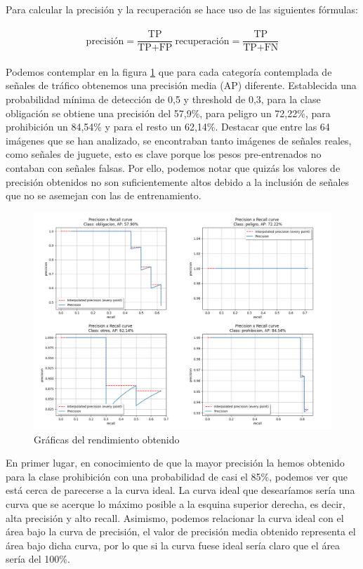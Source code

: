Para calcular la precisión y la recuperación se hace uso de las siguientes fórmulas:\\
\\
$$\text{precisión} = \frac{\text{TP}}{\text{TP} + \text{FP}}\ \text{recuperación} = \frac{\text{TP}}{\text{TP} + \text{FN}}$$
\\

Podemos contemplar en la figura \ref{rendimiento} que para cada categoría contemplada de señales de tráfico obtenemos una precisión media (AP) diferente. Establecida una probabilidad mínima de detección de 0,5 y threshold de 0,3, para la clase obligación se obtiene una precisión del 57,9\%, para peligro un 72,22\%, para prohibición un 84,54\% y para el resto un 62,14\%. Destacar que entre las 64 imágenes que se han analizado, se encontraban tanto imágenes de señales reales, como señales de juguete, esto es clave porque los pesos pre-entrenados no contaban con señales falsas. Por ello, podemos notar que quizás los valores de precisión obtenidos no son suficientemente altos debido a la inclusión de señales que no se asemejan con las de entrenamiento.\\

\begin{figure}[H]
    \centering
 	\includegraphics[width=\textwidth]{Imagenes/IA/rendimiento.pdf}
    \caption{Gráficas del rendimiento obtenido}
    \label{rendimiento}
\end{figure}

En primer lugar, en conocimiento de que la mayor precisión la hemos obtenido para la clase prohibición con una probabilidad de casi el 85\%, podemos ver que está cerca de parecerse a la curva ideal. La curva ideal que desearíamos sería una curva que se acerque lo máximo posible a la esquina superior derecha, es decir, alta precisión y alto recall. Asimismo, podemos relacionar la curva ideal con el área bajo la curva de precisión, el valor de precisión media obtenido representa el área bajo dicha curva, por lo que si la curva fuese ideal sería claro que el área sería del 100\%.\\

